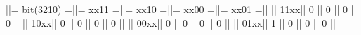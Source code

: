 \begin{textcode}
||= bit(3210) =||= xx11 =||= xx10 =||= xx00 =||= xx01 =||
||         11xx||     0  ||     0  ||     0  ||     0  ||
||         10xx||     0  ||     0  ||     0  ||     0  ||
||         00xx||     0  ||     0  ||     0  ||     0  ||
||         01xx||     1  ||     0  ||     0  ||     0  ||
\end{textcode}

